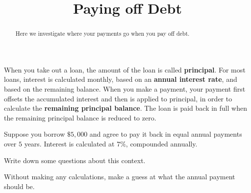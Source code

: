 \documentclass[handout,space,nooutcomes]{ximera}
\title{Paying off Debt}
\begin{document}
\begin{abstract}
Here we investigate where your payments go when you pay off debt.
\end{abstract}
\maketitle

When you take out a loan, the amount of the loan is called
\textbf{principal}.  For most loans, interest is calculated monthly,
based on an \textbf{annual interest rate}, and based on the remaining
balance.  When you make a payment, your payment first offsets the
accumulated interest and then is applied to principal, in order to
calculate the \textbf{remaining principal balance}.  The loan is paid
back in full when the remaining principal balance is reduced to zero.

\begin{question}[2.5in]
Suppose you borrow $\$5,000$ and agree to pay it back in equal annual
payments over $5$ years.  Interest is calculated at $7\%$,
compounded annually. 

Write down some questions about this context.  


\end{question}


\begin{question}[1in]
Without making any calculations, make a guess at what the annual payment should be.  
\begin{freeResponse}
\end{freeResponse}
\end{question}
\end{document}

